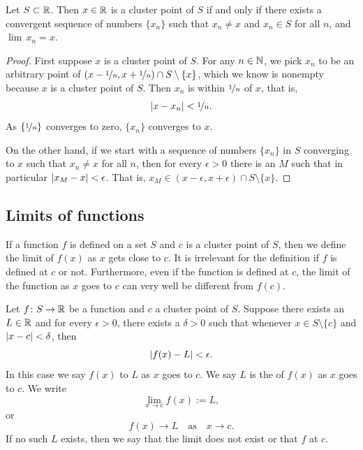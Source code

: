 \begin{prop}
Let $S \subset {\mathbb{R}}$.  Then $x \in {\mathbb{R}}$ is a cluster point of $S$
if and only if
there exists a convergent sequence of numbers $\{ x_n \}$ such that
$x_n \not= x$ and $x_n \in S$ for all $n$, and $\lim\, x_n = x$.
\end{prop}

\begin{proof}
First suppose $x$ is a cluster point of $S$.
For any $n \in {\mathbb{N}}$, we pick $x_n$ to be an arbitrary point of
$(x-\nicefrac{1}{n},x+\nicefrac{1}{n}) \cap S \setminus \{x\}$, which
we know is nonempty because $x$ is a cluster point of $S$.
Then
$x_n$ is within $\nicefrac{1}{n}$ of $x$, that is,
\begin{equation*}
\left\lvert {x-x_n} \right\rvert < \nicefrac{1}{n} .
\end{equation*}
As $\{ \nicefrac{1}{n} \}$ converges to zero, $\{ x_n \}$ converges to $x$.

On the other hand, if we start with a sequence of numbers $\{ x_n \}$ in $S$
converging to $x$ such that $x_n \not= x$ for all $n$, then for every
$\epsilon > 0$ there is an $M$ such that in particular $\left\lvert {x_M - x} \right\rvert <
\epsilon$.  That is, $x_M \in (x-\epsilon,x+\epsilon) \cap S \setminus \{x\}$.
\end{proof}

\subsection{Limits of functions}

If a function $f$ is defined on a set $S$ and $c$ is a cluster point of $S$,
then we define the limit of $f(x)$ as $x$ gets close to $c$.  
It is irrelevant for the definition if $f$ is defined at $c$ or not.
Furthermore, even if the function is defined at $c$, the limit of the
function as $x$ goes to $c$ can very well be different
from $f(c)$.

\begin{defn}
%
Let $f \colon S \to {\mathbb{R}}$ be a function and $c$ a cluster point of $S$.
Suppose there exists an $L \in {\mathbb{R}}$ and for every $\epsilon > 0$,
there exists a $\delta > 0$ such that whenever $x \in S \setminus \{ c \}$
and $\left\lvert {x - c} \right\rvert < \delta$, then
\begin{equation*}
\left\lvert {f(x) - L} \right\rvert < \epsilon .
\end{equation*}
In this case we say $f(x)$ \emph{} to $L$ as $x$ goes
to $c$.  We say $L$ is the \emph{} of $f(x)$ as $x$
goes to $c$.  We write
\begin{equation*}
\lim_{x \to c} f(x) := L ,
\end{equation*}
or 
\begin{equation*}
f(x) \to L \quad\text{as}\quad x \to c .
\end{equation*}
If no such $L$ exists, then we say that the limit does not exist or
that $f$ \emph{} at $c$.
\end{defn}

